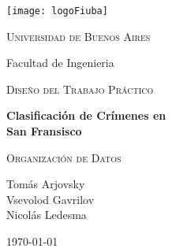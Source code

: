 \begin{titlepage}
  \centering
  \texttt{[image: logoFiuba]}\par\vspace{1cm}
  {\scshape\LARGE{Universidad de Buenos Aires}} \\
  {\Large{Facultad de Ingenieria}\par}
  \vspace{1cm}
  {\scshape\Large Diseño del Trabajo Práctico \par}
  \vspace{1.5cm}
  {\huge\bfseries Clasificación de Crímenes en\\ San Fransisco\par}
  \vspace{2cm}
  {\Large\textsc{Organización de Datos}}
  \vfill
  {Tomás Arjovsky\\ Vsevolod Gavrilov\\ Nicolás Ledesma \par}

  \vfill

  {\large \today\par}
\end{titlepage}
